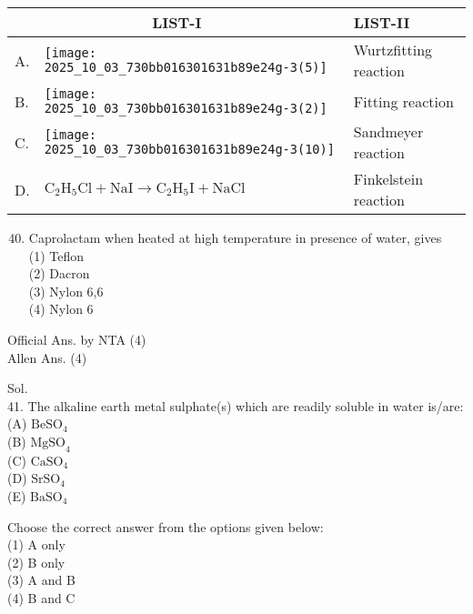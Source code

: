 \documentclass[10pt]{article}
\begin{document}
\begin{center}
\begin{tabular}{|l|l|l|}
\hline
\multicolumn{2}{|c|}{LIST-I} & LIST-II \\
\hline
A. & \texttt{[image: 2025\_10\_03\_730bb016301631b89e24g-3(5)]}
 & Wurtzfitting reaction \\
\hline
B. & \texttt{[image: 2025\_10\_03\_730bb016301631b89e24g-3(2)]}
 & Fitting reaction \\
\hline
C. & \texttt{[image: 2025\_10\_03\_730bb016301631b89e24g-3(10)]}
 & Sandmeyer reaction \\
\hline
D. & \(\mathrm{C}_{2} \mathrm{H}_{5} \mathrm{Cl}+\mathrm{NaI} \rightarrow \mathrm{C}_{2} \mathrm{H}_{5} \mathrm{I}+\mathrm{NaCl}\) & Finkelstein reaction \\
\hline
\end{tabular}
\end{center}

\begin{enumerate}
  \setcounter{enumi}{39}
  \item Caprolactam when heated at high temperature in presence of water, gives\\
(1) Teflon\\
(2) Dacron\\
(3) Nylon 6,6\\
(4) Nylon 6
\end{enumerate}

Official Ans. by NTA (4)\\
Allen Ans. (4)

Sol.\\
41. The alkaline earth metal sulphate(s) which are readily soluble in water is/are:\\
(A) \(\mathrm{BeSO}_{4}\)\\
(B) \(\mathrm{MgSO}_{4}\)\\
(C) \(\mathrm{CaSO}_{4}\)\\
(D) \(\mathrm{SrSO}_{4}\)\\
(E) \(\mathrm{BaSO}_{4}\)

Choose the correct answer from the options given below:\\
(1) A only\\
(2) B only\\
(3) A and B\\
(4) B and C
\end{document}
